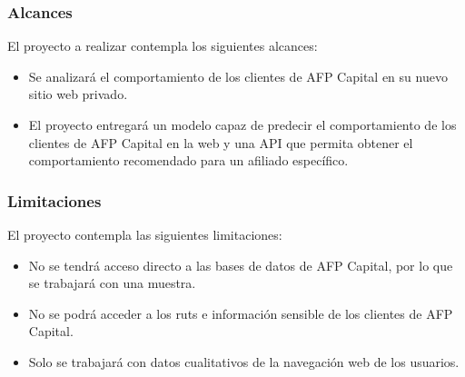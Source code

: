 \subsubsection{Alcances}

El proyecto a realizar contempla los siguientes alcances: 

\begin{itemize}
    \item Se analizará el comportamiento de los clientes de AFP Capital en su nuevo sitio web privado.
    \item El proyecto entregará un modelo capaz de predecir el comportamiento de los clientes de AFP Capital en la web y una API que permita obtener el comportamiento recomendado para un afiliado específico.
\end{itemize}


\subsubsection{Limitaciones }

El proyecto contempla las siguientes limitaciones:

\begin{itemize}
    \item No se tendrá acceso directo a las bases de datos de AFP Capital, por lo que se trabajará con una muestra.
    \item No se podrá acceder a los ruts e información sensible de los clientes de AFP Capital.
    \item Solo se trabajará con datos cualitativos de la navegación web de los usuarios.
\end{itemize}
